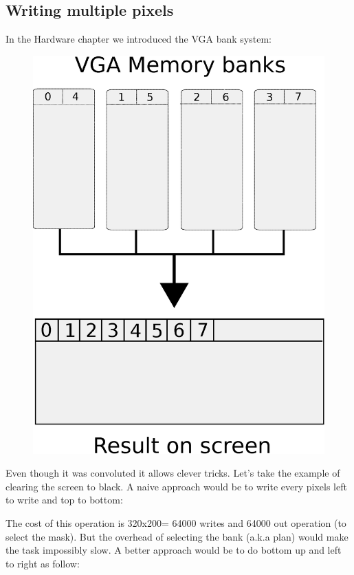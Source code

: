 \subsection{Writing multiple pixels}
In the Hardware chapter we introduced the VGA bank system:
\begin{figure}[H]
\centering
\includegraphics[width=\textwidth]{imgs/vga_ram_screen_layout.eps}
\end{figure}

Even though it was convoluted it allows clever tricks. Let's take the example of clearing the screen to black. A naive approach would be to write every pixels left to write and top to bottom:




The cost of this operation is 320x200= 64000 writes and 64000 out operation (to select the mask).
But the overhead of selecting the bank (a.k.a plan) would make the task impossibly slow. A better approach would be to do bottom up and left to right as follow:

